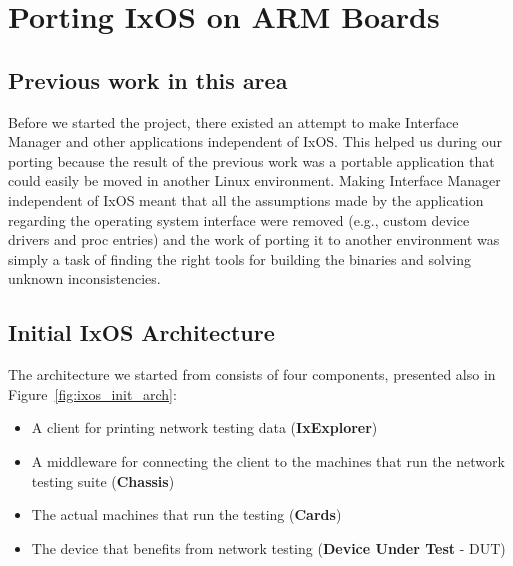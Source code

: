 \section{Porting IxOS on ARM Boards}


\subsection{Previous work in this area}

Before we started the project, there existed an attempt to make Interface Manager
and other applications independent of IxOS. This helped us during our porting
because the result of the previous work was a portable application that could
easily be moved in another Linux environment. Making Interface Manager
independent of IxOS meant that all the assumptions made by the application
regarding the operating system interface were removed (e.g., custom device
drivers and proc entries) and the work of porting it to another environment
was simply a task of finding the right tools for building the binaries and
solving unknown inconsistencies.



\subsection{Initial IxOS Architecture}

\begin{figure*}
    \centering
    \def\svgscale{0.95}
    
    \caption{Initial IxOS architecture }
    \label{fig:ixos_init_arch}
\end{figure*}

The architecture we started from consists of four components, presented also in
Figure~\ref{fig:ixos_init_arch}:
\begin{itemize}
    \item A client for printing network testing data (\textbf{IxExplorer})
    \item A middleware for connecting the client to the machines that run the
    network testing suite (\textbf{Chassis})
    \item The actual machines that run the testing (\textbf{Cards})
    \item The device that benefits from network testing (\textbf{Device Under Test} - DUT)
\end{itemize}

